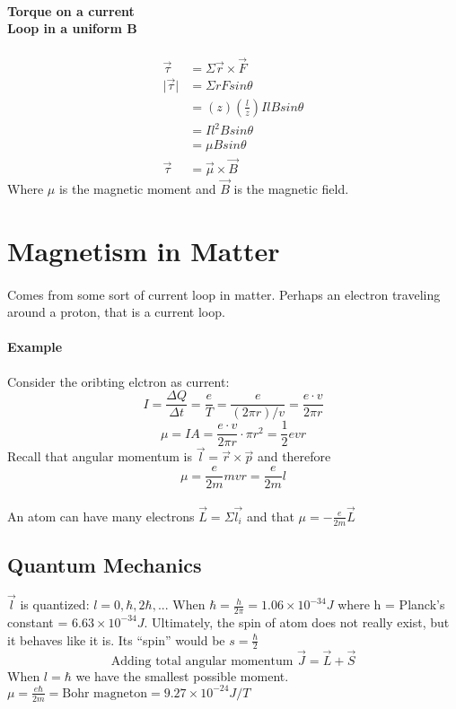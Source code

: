 \documentclass{article}
\begin{document}
    \paragraph{Torque on a current\\Loop in a uniform B}

    \begin{align*}
        \vec{\tau} &= \Sigma\vec{r}\times\vec{F}\\
        \lvert \vec{\tau}\rvert &= \Sigma rFsin\theta\\
        &= (z)(\frac{l}{z})I l B sin \theta \\
        &= I l^2Bsin\theta \\
        &= \mu B sin\theta \\
        \vec{\tau} &= \vec{\mu} \times \vec{B}
    \end{align*}
    Where $\mu$ is the magnetic moment and $\vec{B}$ is the magnetic field.
    \section{Magnetism in Matter}
    \paragraph{} Comes from some sort of current loop in matter. Perhaps an electron traveling around a proton, that is a current loop. 
    \paragraph{Example} Consider the oribting elctron as current:
    $$I = \frac{\Delta Q}{\Delta t} = \frac{e}{T} = \frac{e}{(2\pi r) / v} = \frac{e\cdot v}{2\pi r}$$
    $$\mu = IA = \frac{e\cdot v}{2\pi r} \cdot \pi r^2 = \frac{1}{2}evr$$
    Recall that angular momentum is $\vec{l} = \vec{r} \times \vec{p}$ and therefore 
    $$\mu = \frac{e}{2m}mvr = \frac{e}{2m}l$$
    \\An atom can have many electrons $\vec{L} = \Sigma \vec{l_i}$ and that $\mu = -\frac{e}{2m}\vec{L}$
    \subsection{Quantum Mechanics} $\vec{l}$ is quantized: $l = 0, \hbar, 2\hbar, ...$ 
    When $\hbar = \frac{h}{2\pi} = 1.06\times 10^{-34}J$ where h = Planck's constant = $6.63\times 10^{-34}J$. 
    Ultimately, the spin of atom does not really exist, but it behaves like it is. Its ``spin'' would be $s = \frac{\hbar}{2}$
    $$\text{Adding total angular momentum } \vec{J} = \vec{L} + \vec{S}$$
    When $l = \hbar$ we have the smallest possible moment. $\mu = \frac{e\hbar}{2m} = \text{Bohr magneton} = 9.27\times 10^{-24}J/T$
\end{document}
